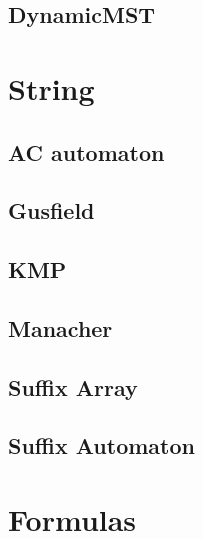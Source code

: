 \subsection{DynamicMST}

\section{String}
\subsection{AC automaton}

\subsection{Gusfield}

\subsection{KMP}

\subsection{Manacher}

\subsection{Suffix Array}

\subsection{Suffix Automaton}


\section{Formulas}

